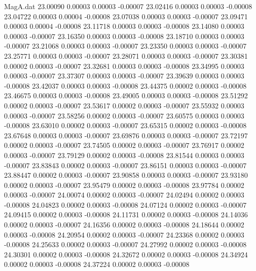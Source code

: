 \begin{filecontents}{MagA.dat}
  23.00090    0.00003    0.00003   -0.00007
  23.02416    0.00003    0.00003   -0.00008
  23.04722    0.00003    0.00004   -0.00008
  23.07038    0.00003    0.00003   -0.00007
  23.09471    0.00003    0.00004   -0.00008
  23.11718    0.00003    0.00003   -0.00008
  23.14080    0.00003    0.00003   -0.00007
  23.16350    0.00003    0.00003   -0.00008
  23.18710    0.00003    0.00003   -0.00007
  23.21068    0.00003    0.00003   -0.00007
  23.23350    0.00003    0.00003   -0.00007
  23.25771    0.00003    0.00003   -0.00007
  23.28071    0.00003    0.00003   -0.00007
  23.30381    0.00002    0.00003   -0.00007
  23.32681    0.00003    0.00003   -0.00008
  23.34995    0.00003    0.00003   -0.00007
  23.37307    0.00003    0.00003   -0.00007
  23.39639    0.00003    0.00003   -0.00008
  23.42037    0.00003    0.00003   -0.00008
  23.44375    0.00002    0.00003   -0.00008
  23.46675    0.00003    0.00003   -0.00008
  23.49005    0.00003    0.00003   -0.00008
  23.51292    0.00002    0.00003   -0.00007
  23.53617    0.00002    0.00003   -0.00007
  23.55932    0.00003    0.00003   -0.00007
  23.58256    0.00002    0.00003   -0.00007
  23.60575    0.00003    0.00003   -0.00008
  23.63010    0.00002    0.00003   -0.00007
  23.65315    0.00002    0.00003   -0.00008
  23.67648    0.00003    0.00003   -0.00007
  23.69876    0.00003    0.00003   -0.00007
  23.72197    0.00002    0.00003   -0.00007
  23.74505    0.00002    0.00003   -0.00007
  23.76917    0.00002    0.00003   -0.00007
  23.79129    0.00002    0.00003   -0.00008
  23.81544    0.00003    0.00003   -0.00007
  23.83843    0.00002    0.00003   -0.00007
  23.86151    0.00003    0.00003   -0.00007
  23.88447    0.00002    0.00003   -0.00007
  23.90858    0.00003    0.00003   -0.00007
  23.93180    0.00002    0.00003   -0.00007
  23.95479    0.00002    0.00003   -0.00008
  23.97784    0.00002    0.00003   -0.00007
  24.00074    0.00002    0.00003   -0.00007
  24.02494    0.00002    0.00003   -0.00008
  24.04823    0.00002    0.00003   -0.00008
  24.07124    0.00002    0.00003   -0.00007
  24.09415    0.00002    0.00003   -0.00008
  24.11731    0.00002    0.00003   -0.00008
  24.14036    0.00002    0.00003   -0.00007
  24.16356    0.00002    0.00003   -0.00008
  24.18644    0.00002    0.00003   -0.00008
  24.20954    0.00002    0.00003   -0.00007
  24.23368    0.00002    0.00003   -0.00008
  24.25633    0.00002    0.00003   -0.00007
  24.27992    0.00002    0.00003   -0.00008
  24.30301    0.00002    0.00003   -0.00008
  24.32672    0.00002    0.00003   -0.00008
  24.34924    0.00002    0.00003   -0.00008
  24.37224    0.00002    0.00003   -0.00008

\end{filecontents}
